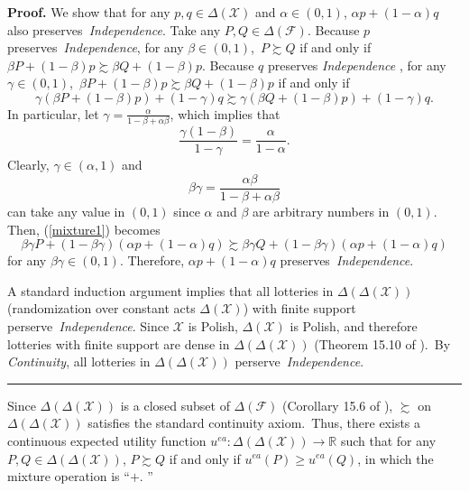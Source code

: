 \documentclass[12pt, notitlepage]{article}
\newenvironment{proof}[1][Proof]{\noindent\textbf{#1.} }{\ \rule{0.5em}{0.5em}}
\begin{document}
\begin{proof}
{We show that for any $p,q\in \Delta (\mathcal{X})$ and $\alpha \in (0,1)$, $%
\alpha p+(1-\alpha )q$ also preserves\textit{\ Independence}. Take any $%
P,Q\in \Delta (\mathcal{F})$. Because $p$ preserves\textit{\ Independence},
for any }$\beta \in (0,1)$,{\ $P\succsim Q$ if and only if $\beta P+(1-\beta
)p\succsim \beta Q+(1-\beta )p$. Because $q$ preserves \textit{Independence}%
, for any }$\gamma \in (0,1)$,{\ $\beta P+(1-\beta )p\succsim \beta
Q+(1-\beta )p$ if and only if%
\begin{equation}
\gamma (\beta P+(1-\beta )p)+(1-\gamma )q\succsim \gamma (\beta Q+(1-\beta
)p)+(1-\gamma )q.  \label{mixture1}
\end{equation}%
In particular, let $\gamma =\frac{\alpha }{1-\beta +\alpha \beta }$, which
implies that%
\begin{equation*}
\frac{\gamma (1-\beta )}{1-\gamma }=\frac{\alpha }{1-\alpha }.
\end{equation*}%
Clearly, $\gamma \in \left( \alpha ,1\right) $ and%
\begin{equation*}
\beta \gamma =\frac{\alpha \beta }{1-\beta +\alpha \beta }
\end{equation*}%
can take any value in $(0,1)$ since }$\alpha $ and $\beta $ are arbitrary
numbers in $(0,1)${. Then, (\ref{mixture1}) becomes%
\begin{equation*}
\beta \gamma P+(1-\beta \gamma )(\alpha p+(1-\alpha )q)\succsim \beta \gamma
Q+(1-\beta \gamma )(\alpha p+(1-\alpha )q)
\end{equation*}%
for any $\beta \gamma \in (0,1)$. Therefore, $\alpha p+(1-\alpha )q$
preserves\textit{\ Independence}.}

{A standard induction argument implies that all lotteries in $\Delta (\Delta
(\mathcal{X}))$ (randomization over constant acts }$\Delta (\mathcal{X})${)
with finite support perserve\textit{\ Independence}. Since }$\mathcal{X}$ is
Polish, $\Delta (\mathcal{X})$ is Polish, and therefore lotteries with
finite support are dense in $\Delta (\Delta (\mathcal{X}))$ (Theorem 15.10
of \cite{AliprantisBorder06}).{\ By \textit{Continuity}, all lotteries in $%
\Delta (\Delta (\mathcal{X}))$ perserve\textit{\ Independence}.}
\end{proof}

Since {$\Delta (\Delta (\mathcal{X}))$ is a closed subset of }$\Delta (%
\mathcal{F})$ (Corollary 15.6 of \cite{AliprantisBorder06}), $\succsim $ on $%
\Delta (\Delta (\mathcal{X}))$ satisfies the standard continuity axiom.{\
Thus, there exists a continuous expected utility function $u^{ea}:\Delta
(\Delta (\mathcal{X}))\rightarrow \mathbb{R}$ such that for any $P,Q\in
\Delta (\Delta (\mathcal{X}))$, $P\succsim Q$ if and only if $u^{ea}(P)\geq
u^{ea}(Q)$, in which the mixture operation is \textquotedblleft }$+$.{%
\textquotedblright }
\end{document}
